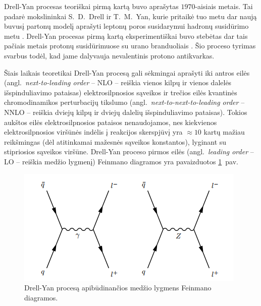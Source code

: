 \documentclass[a4paper, 12pt, oneside]{article}
\begin{document}
Drell-Yan procesas teoriškai pirmą kartą buvo aprašytas $1970$-aisiais metais.
Tai padarė mokslininkai S.~D.~Drell ir T.~M.~Yan, kurie pritaikė tuo metu dar naują buvusį partonų modelį aprašyti
leptonų poros susidarymui hadronų susidūrimo metu \cite{DYoriginal}.
Drell-Yan procesas pirmą kartą eksperimentiškai buvo stebėtas dar tais pačiais metais protonų susidūrimuose
su urano branduoliais \cite{DY_firstExp}.
Šio proceso tyrimas svarbus todėl, kad jame dalyvauja nevalentinis protono antikvarkas.

Šiais laikais teoretikai Drell-Yan procesą gali sėkmingai aprašyti iki antros eilės (angl.\ \textit{next-to-leading order} -- NLO --
reiškia vienos kilpų ir vienos dalelės išspinduliavimo pataisas) elektrosilpnosios sąveikos
ir trečios eilės kvantinės chromodinamikos perturbacijų tikslumo (angl.\ \textit{next-to-next-to-leading order} -- NNLO --
reiškia dviejų kilpų ir dviejų dalelių išspinduliavimo pataisas).
Tokios aukštos eilės elektrosilpnosios pataisos nenaudojamos, nes kiekvienos elektrosilpnosios viršūnės
indėlis į reakcijos skerspjūvį yra $\approx10$ kartų mažiau reikšmingas (dėl atitinkamai mažesnės sąveikos konstantos), lyginant su
stipriosios sąveikos viršūne.
Drell-Yan proceso pirmos eilės (angl.\ \textit{leading order} -- LO -- reiškia medžio lygmenį) Feinmano diagramos
yra pavaizduotos \ref{fig:DYfeyn}~pav.

\begin{figure}[t]
\centering
\includegraphics[scale=0.75]{DYprocess.PNG}
\caption{Drell-Yan procesą apibūdinančios medžio lygmens Feinmano diagramos.}
\label{fig:DYfeyn}
\end{figure}
\end{document}
